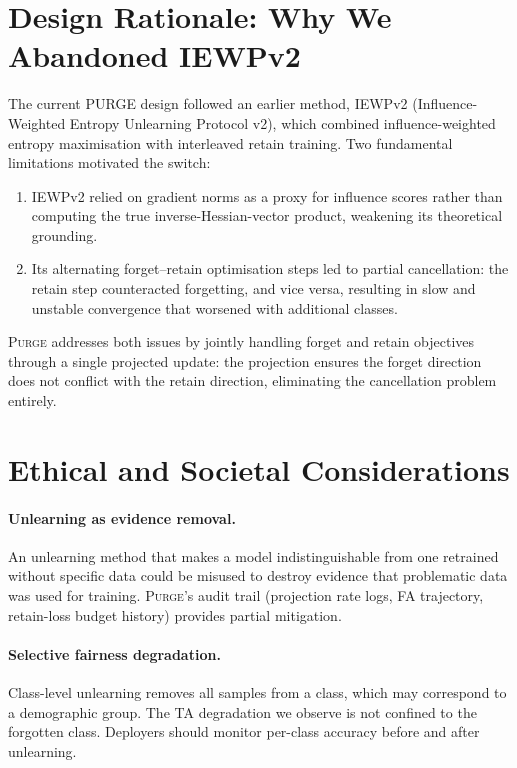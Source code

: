 \documentclass[letterpaper]{article}
\newcommand{\ours}{\textsc{Purge}}
\begin{document}
\section{Design Rationale: Why We Abandoned IEWPv2}

The current PURGE design followed an earlier method, IEWPv2 (Influence-Weighted Entropy Unlearning Protocol v2), which combined influence-weighted entropy maximisation with interleaved retain training. Two fundamental limitations motivated the switch:

\begin{enumerate}[nosep]
\item IEWPv2 relied on gradient norms as a proxy for influence scores rather than computing the true inverse-Hessian-vector product, weakening its theoretical grounding.
\item Its alternating forget--retain optimisation steps led to partial cancellation: the retain step counteracted forgetting, and vice versa, resulting in slow and unstable convergence that worsened with additional classes.
\end{enumerate}

\ours{} addresses both issues by jointly handling forget and retain objectives through a single projected update: the projection ensures the forget direction does not conflict with the retain direction, eliminating the cancellation problem entirely.

\section{Ethical and Societal Considerations}

\paragraph{Unlearning as evidence removal.}
An unlearning method that makes a model indistinguishable from one retrained without specific data could be misused to destroy evidence that problematic data was used for training. \ours{}'s audit trail (projection rate logs, FA trajectory, retain-loss budget history) provides partial mitigation.

\paragraph{Selective fairness degradation.}
Class-level unlearning removes all samples from a class, which may correspond to a demographic group. The TA degradation we observe is not confined to the forgotten class. Deployers should monitor per-class accuracy before and after unlearning.
\end{document}
